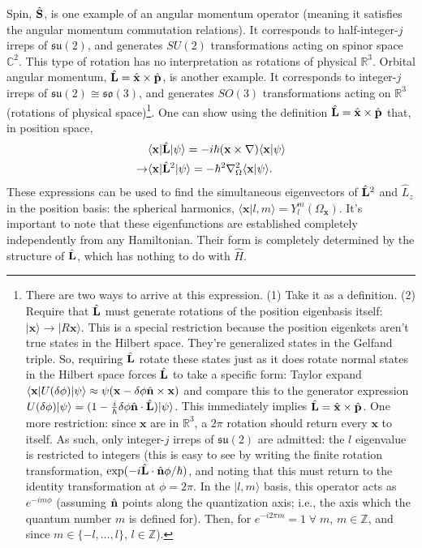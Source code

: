 Spin, $\hat{\mathbf{S}}$, is one example of an angular momentum operator (meaning it satisfies the angular momentum commutation relations). It corresponds to half-integer-$j$ irreps of $\mathfrak{su}(2)$, and generates $SU(2)$ transformations acting on spinor space $\mathbb{C}^2$. This type of rotation has no interpretation as rotations of physical $\mathbb{R}^3$. Orbital angular momentum, $\hat{\mathbf{L}}=\hat{\mathbf{x}}\times\hat{\mathbf{p}}$, is another example. It corresponds to integer-$j$ irreps of $\mathfrak{su}(2)\cong\mathfrak{so}(3)$, and generates $SO(3)$ transformations acting on $\mathbb{R}^3$ (rotations of physical space)\footnote{
There are two ways to arrive at this expression. (1) Take it as a definition. (2) Require that $\hat{\mathbf{L}}$ must generate rotations of the position eigenbasis itself: $|\mathbf{x}\rangle\rightarrow|R\mathbf{x}\rangle$. This is a special restriction because the position eigenkets aren't true states in the Hilbert space. They're generalized states in the Gelfand triple. So, requiring $\hat{\mathbf{L}}$ rotate these states just as it does rotate normal states in the Hilbert space forces $\hat{\mathbf{L}}$ to take a specific form: Taylor expand $\langle \mathbf{x}|U(\delta\phi)|\psi\rangle\approx\psi(\mathbf{x}-\delta\phi\hat{\mathbf{n}}\times\mathbf{x})$ and compare this to the generator expression $U(\delta\phi)|\psi\rangle=(1-\frac{i}{\hbar}\delta\phi\hat{\mathbf{n}}\cdot\hat{\mathbf{L}})|\psi\rangle$. This immediately implies $\hat{\mathbf{L}}=\hat{\mathbf{x}}\times\hat{\mathbf{p}}$. One more restriction: since $\mathbf{x}$ are in $\mathbb{R}^3$, a $2\pi$ rotation should return every $\mathbf{x}$ to itself. As such, only integer-$j$ irreps of $\mathfrak{su}(2)$ are admitted: the $l$ eigenvalue is restricted to integers (this is easy to see by writing the finite rotation transformation, $\exp(-i\hat{\mathbf{L}}\cdot\hat{\mathbf{n}}\phi/\hbar)$, and noting that this must return to the identity transformation at $\phi=2\pi$. In the $|l,m\rangle$ basis, this operator acts as $e^{-im\phi}$ (assuming $\hat{\mathbf{n}}$ points along the quantization axis; i.e., the axis which the quantum number $m$ is defined for). Then, for $e^{-i2\pi m}=1\;\forall\; m$, $m\in\mathbb{Z}$, and since $m\in\{-l, \dots, l\}$, $l\in\mathbb{Z}$). 
}. One can show using the definition $\hat{\mathbf{L}}=\hat{\mathbf{x}}\times\hat{\mathbf{p}}$ that, in position space, 
\begin{align}
    &\langle \mathbf{x}| \hat{\mathbf{L}}|\psi\rangle = -i\hbar(\mathbf{x}\times\nabla)\langle \mathbf{x}|\psi\rangle\nonumber \\
    \rightarrow& \langle \mathbf{x}|\hat{\mathbf{L}}^2|\psi\rangle = -\hbar^2\nabla^2_{\Omega}\langle\mathbf{x}|\psi\rangle\label{eq:angmom-positionrep}.
\end{align}
These expressions can be used to find the simultaneous eigenvectors of $\hat{\mathbf{L}}^2$ and $\hat{L}_z$ in the position basis: the spherical harmonics, $\langle \mathbf{x}|l,m\rangle=Y^m_l(\Omega_{\mathbf{x}})$. It's important to note that these eigenfunctions are established completely independently from any Hamiltonian. Their form is completely determined by the structure of $\hat{\mathbf{L}}$, which has nothing to do with $\hat{H}$.

